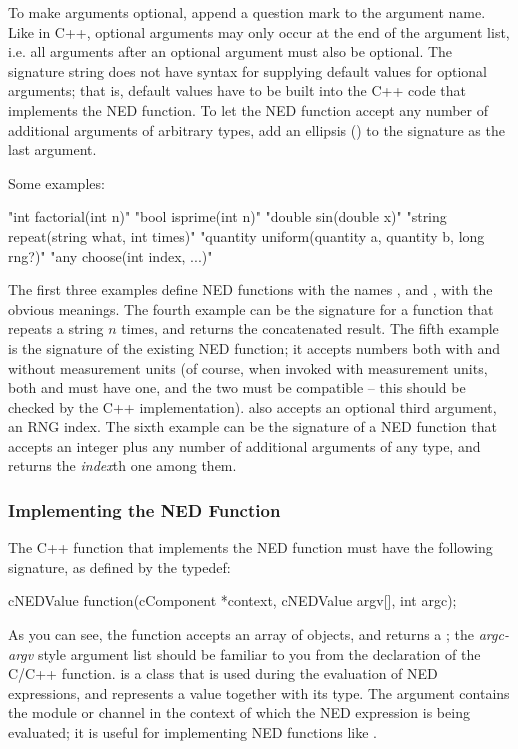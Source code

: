 To make arguments optional, append a question mark to the argument name.
Like in C++, optional arguments may only occur at the end of the argument
list, i.e. all arguments after an optional argument must also be optional.
The signature string does not have syntax for supplying default values for
optional arguments; that is, default values have to be built into the C++
code that implements the NED function. To let the NED function accept any
number of additional arguments of arbitrary types, add an ellipsis
() to the signature as the last argument.

Some examples:

\begin{cpp}
"int factorial(int n)"
"bool isprime(int n)"
"double sin(double x)"
"string repeat(string what, int times)"
"quantity uniform(quantity a, quantity b, long rng?)"
"any choose(int index, ...)"
\end{cpp}

The first three examples define NED functions with the names ,
 and , with the obvious meanings. The fourth example
can be the signature for a function that repeats a string $n$ times, and
returns the concatenated result. The fifth example is the signature of the
existing  NED function; it accepts numbers both with and without
measurement units (of course, when invoked with measurement units, both 
and  must have one, and the two must be compatible -- this should be checked
by the C++ implementation).  also accepts an optional third argument,
an RNG index. The sixth example can be the signature of a 
NED function that accepts an integer plus any number of additional arguments
of any type, and returns the \textit{index}th one among them.

\subsubsection{Implementing the NED Function}
\label{sec:sim-lib:implementing-ned-function}

The C++ function that implements the NED function must have the following
signature, as defined by the  typedef:

\begin{cpp}
cNEDValue function(cComponent *context, cNEDValue argv[], int argc);
\end{cpp}

As you can see, the function accepts an array of 
objects, and returns a ; the \textit{argc-argv} style
argument list should be familiar to you from the declaration of the C/C++
 function.  is a class that is used during
the evaluation of NED expressions, and represents a value together with its
type.  The  argument contains the module or channel in the
context of which the NED expression is being evaluated; it is useful for
implementing NED functions like .

